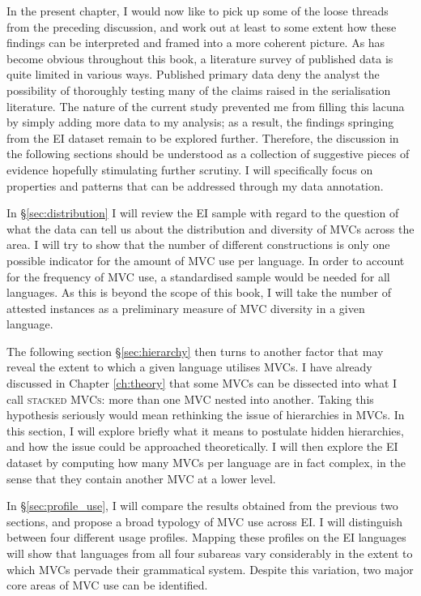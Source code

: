 In the present chapter, I would now like to pick up some of the loose threads from the preceding discussion, and work out at least to some extent how these findings can be interpreted and framed into a more coherent picture. As has become obvious throughout this book, a literature survey of published data is quite limited in various ways. Published primary data deny the analyst the possibility of thoroughly testing many of the claims raised in the serialisation literature. The nature of the current study prevented me from filling this lacuna by simply adding more data to my analysis; as a result, the findings springing from the EI dataset remain to be explored further. Therefore, the discussion in the following sections should be understood as a collection of suggestive pieces of evidence hopefully stimulating further scrutiny. I will specifically focus on properties and patterns that can be addressed through my data annotation.

In §\ref{sec:distribution} I will review the EI sample with regard to the question of what the data can tell us about the distribution and diversity of MVCs across the area. I will try to show that the number of different constructions is only one possible indicator for the amount of MVC use per language. In order to account for the frequency of MVC use, a standardised sample would be needed for all languages. As this is beyond the scope of this book, I will take the number of attested instances as a preliminary measure of MVC diversity in a given language.

The following section §\ref{sec:hierarchy} then turns to another factor that may reveal the extent to which a given language utilises MVCs. I have already discussed in Chapter \ref{ch:theory} that some MVCs can be dissected into what I call \textsc{stacked MVCs}: more than one MVC nested into another. Taking this hypothesis seriously would mean rethinking the issue of hierarchies in MVCs. In this section, I will explore briefly what it means to postulate hidden hierarchies, and how the issue could be approached theoretically. I will then explore the EI dataset by computing how many MVCs per language are in fact complex, in the sense that they contain another MVC at a lower level.

In §\ref{sec:profile_use}, I will compare the results obtained from the previous two sections, and propose a broad typology of MVC use across EI. I will distinguish between four different usage profiles. Mapping these profiles on the EI languages will show that languages from all four subareas vary considerably in the extent to which MVCs pervade their grammatical system. Despite this variation, two major core areas of MVC use can be identified.

